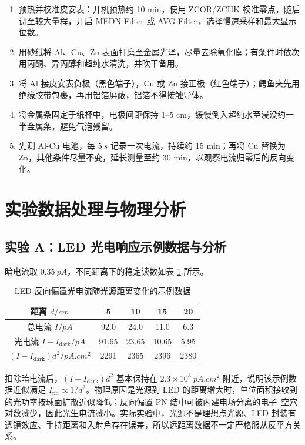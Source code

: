\documentclass[11pt]{article}
\begin{document}
\begin{enumerate}
    \item 预热并校准皮安表：开机预热约 10 min，使用 ZCOR/ZCHK 校准零点，随后调至较大量程，开启 MEDN Filter 或 AVG Filter，选择慢速采样和最大显示位数。
    \item 用砂纸将 Al、Cu、Zn 表面打磨至金属光泽，尽量去除氧化膜；有条件时依次用丙酮、异丙醇和超纯水清洗，并吹干备用。
    \item 将 Al 接皮安表负极（黑色端子），Cu 或 Zn 接正极（红色端子）；鳄鱼夹先用绝缘胶带包裹，再用铝箔屏蔽，铝箔不得接触导体。
    \item 将金属条固定于纸杯中，电极间距保持 1--5 cm，缓慢倒入超纯水至浸没约一半金属条，避免气泡残留。
    \item 先测 Al-Cu 电池，每 $\SI{5}{s}$ 记录一次电流，持续约 15 min；再将 Cu 替换为 Zn，其他条件尽量不变，延长测量至约 30 min，以观察电流归零后的反向变化。
\end{enumerate}

\section{实验数据处理与物理分析}

\subsection{实验 A：LED 光电响应示例数据与分析}

暗电流取 $\SI{0.35}{pA}$，不同距离下的稳定读数如表 \ref{tab:led-distance} 所示。

\begin{table}[H]
    \centering
    \caption{LED 反向偏置光电流随光源距离变化的示例数据}
    \label{tab:led-distance}
    \begin{tabular}{ccccc}
        \toprule
        距离 $d/\si{cm}$ & 5 & 10 & 15 & 20 \\
        \midrule
        总电流 $I/\si{pA}$ & 92.0 & 24.0 & 11.0 & 6.3 \\
        光电流 $I-I_{\mathrm{dark}}/\si{pA}$ & 91.65 & 23.65 & 10.65 & 5.95 \\
        $(I-I_{\mathrm{dark}})d^2/\si{pA.cm^2}$ & 2291 & 2365 & 2396 & 2380 \\
        \bottomrule
    \end{tabular}
\end{table}

扣除暗电流后，$(I-I_{\mathrm{dark}})d^2$ 基本保持在 $2.3\times10^3\ \si{pA.cm^2}$ 附近，说明该示例数据近似满足 $I_{\mathrm{ph}}\propto 1/d^2$。物理原因是光源到 LED 的距离增大时，单位面积接收到的光功率按球面扩散近似降低；反向偏置 PN 结中可被内建电场分离的电子--空穴对数减少，因此光生电流减小。实际实验中，光源不是理想点光源、LED 封装有透镜效应、手持距离和入射角存在误差，所以远距离数据不一定严格服从反平方关系。
\end{document}
